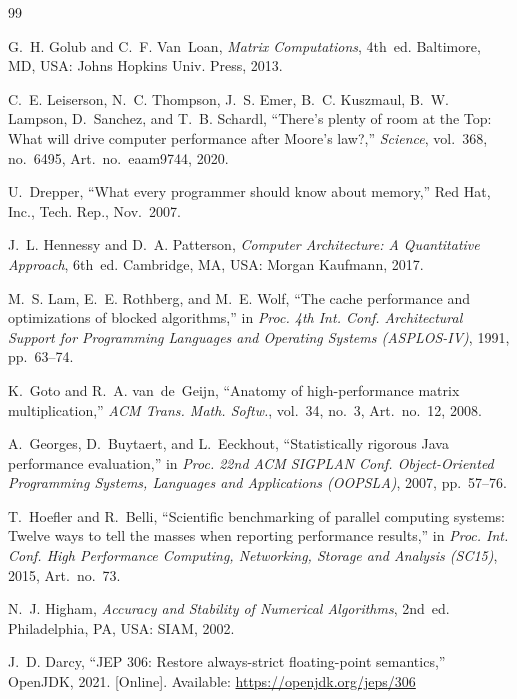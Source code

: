 \documentclass[12pt,a4paper]{report}
\begin{document}
\begin{thebibliography}{99}

 G.~H. Golub and C.~F. Van~Loan, \textit{Matrix Computations}, 4th~ed. Baltimore, MD, USA: Johns
Hopkins Univ. Press, 2013.

 C.~E. Leiserson, N.~C. Thompson, J.~S. Emer, B.~C. Kuszmaul, B.~W. Lampson, D.~Sanchez, and
T.~B. Schardl, ``There's plenty of room at the Top: What will drive computer performance after Moore's law?,''
\textit{Science}, vol.~368, no.~6495, Art.~no.~eaam9744, 2020.

 U.~Drepper, ``What every programmer should know about memory,'' Red Hat, Inc., Tech. Rep.,
Nov.~2007.

 J.~L. Hennessy and D.~A. Patterson, \textit{Computer Architecture: A Quantitative Approach},
6th~ed. Cambridge, MA, USA: Morgan Kaufmann, 2017.

 M.~S. Lam, E.~E. Rothberg, and M.~E. Wolf, ``The cache performance and optimizations of blocked
algorithms,'' in \textit{Proc. 4th Int. Conf. Architectural Support for Programming Languages and Operating Systems
(ASPLOS-IV)}, 1991, pp.~63--74.

 K.~Goto and R.~A. van~de~Geijn, ``Anatomy of high-performance matrix multiplication,''
\textit{ACM Trans. Math. Softw.}, vol.~34, no.~3, Art.~no.~12, 2008.

 A.~Georges, D.~Buytaert, and L.~Eeckhout, ``Statistically rigorous Java performance
evaluation,'' in \textit{Proc. 22nd ACM SIGPLAN Conf. Object-Oriented Programming Systems, Languages and Applications
(OOPSLA)}, 2007, pp.~57--76.

 T.~Hoefler and R.~Belli, ``Scientific benchmarking of parallel computing systems: Twelve ways to
tell the masses when reporting performance results,'' in \textit{Proc. Int. Conf. High Performance Computing,
Networking, Storage and Analysis (SC15)}, 2015, Art.~no.~73.

 N.~J. Higham, \textit{Accuracy and Stability of Numerical Algorithms}, 2nd~ed. Philadelphia, PA,
USA: SIAM, 2002.

 J.~D. Darcy, ``JEP 306: Restore always-strict floating-point semantics,'' OpenJDK, 2021. [Online].
Available: \url{https://openjdk.org/jeps/306}

\end{thebibliography}
\end{document}
